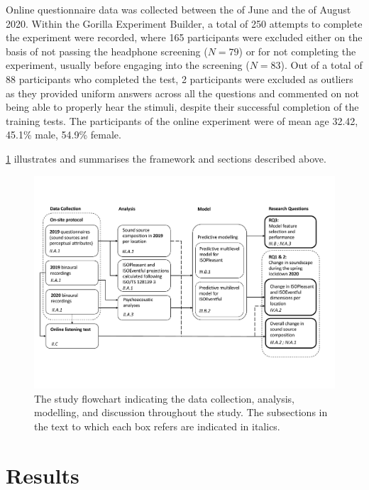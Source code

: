    Online questionnaire data was collected between the  of June and the  of August 2020. Within the Gorilla Experiment Builder, a total of 250 attempts to complete the experiment were recorded, where 165 participants were excluded either on the basis of not passing the headphone screening ($N=79$) or for not completing the experiment, usually before engaging into the screening ($N=83$). Out of a total of 88 participants who completed the test, 2 participants were excluded as outliers as they provided uniform answers across all the questions and commented on not being able to properly hear the stimuli, despite their successful completion of the training tests. The participants of the online experiment were of mean age 32.42, 45.1\% male, 54.9\% female.

   \cref{fig:lockdown-study-framework} illustrates and summarises the framework and sections described above.

   \begin{figure}[h]
     \centering
     \includegraphics[width=\textwidth]{Figures/Lockdown-Fig1.pdf}
     \caption{The study flowchart indicating the data collection, analysis, modelling, and discussion throughout the study. The subsections in the text to which each box refers are indicated in italics. \label{fig:lockdown-study-framework}}
   \end{figure}

\section{Results}

